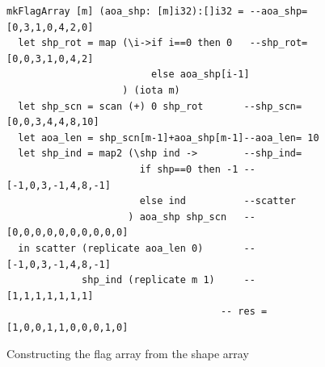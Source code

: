 \documentclass[acmsmall,review]{acmart}\settopmatter{printfolios=true,printccs=false,printacmref=false}
\begin{document}

\begin{figure}
\begin{lstlisting}[mathescape=true]
mkFlagArray [m] (aoa_shp: [m]i32):[]i32 = --aoa_shp=[0,3,1,0,4,2,0]
  let shp_rot = map (\i->if i==0 then 0   --shp_rot=[0,0,3,1,0,4,2]
                         else aoa_shp[i-1]
                    ) (iota m)
  let shp_scn = scan (+) 0 shp_rot       --shp_scn=[0,0,3,4,4,8,10]
  let aoa_len = shp_scn[m-1]+aoa_shp[m-1]--aoa_len= 10
  let shp_ind = map2 (\shp ind ->        --shp_ind= 
                       if shp==0 then -1 --  [-1,0,3,-1,4,8,-1]
                       else ind          --scatter
                     ) aoa_shp shp_scn   --   [0,0,0,0,0,0,0,0,0,0]
  in scatter (replicate aoa_len 0)       --   [-1,0,3,-1,4,8,-1]
             shp_ind (replicate m 1)     --   [1,1,1,1,1,1,1]
                                     -- res = [1,0,0,1,1,0,0,0,1,0] 
\end{lstlisting}\vspace{-4ex}
\caption{Constructing the flag array from the shape array}
\label{fig:make-flag}
\end{figure}
\end{document}
